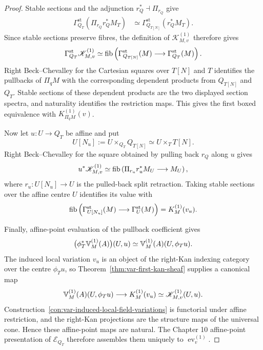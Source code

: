\begin{proof}
Stable sections and the adjunction \(r_Q^*\dashv\Pi_{r_Q}\) give
\[
\begin{aligned}
    \Gamma_{Q_T}^{\mathrm{st}}
    \left(
      \Pi_{r_Q}r_Q^*M_T
    \right)
    &\simeq
    \Gamma_{Q_{T[N]}}^{\mathrm{st}}
    (r_Q^*M_T).
\end{aligned}
\]
Since stable sections preserve fibres, the definition of \(\mathscr K^{(1)}_{M,v}\) therefore gives
\[
    \Gamma_{Q_T}^{\mathrm{st}}
    \mathscr K^{(1)}_{M,v}
    \simeq
    \operatorname{fib}\left(
      \Gamma_{Q_{T[N]}}^{\mathrm{st}}(M)
      \longrightarrow
      \Gamma_{Q_T}^{\mathrm{st}}(M)
    \right).
\]
Right Beck--Chevalley for the Cartesian squares over \(T[N]\) and \(T\) identifies the pullbacks of \(\Pi_qM\) with the corresponding dependent products from \(Q_{T[N]}\) and \(Q_T\). Stable sections of these dependent products are the two displayed section spectra, and naturality identifies the restriction maps. This gives the first boxed equivalence with \(K_{\Pi_qM}^{(1)}(v)\).

Now let \(u:U\to Q_T\) be affine and put
\[
    U[N_u]:=U\times_{Q_T}Q_{T[N]}
    \simeq
    U\times_TT[N].
\]
Right Beck--Chevalley for the square obtained by pulling back \(r_Q\) along \(u\) gives
\[
    u^*\mathscr K^{(1)}_{M,v}
    \simeq
    \operatorname{fib}\left(
      \Pi_{r_u}r_u^*M_U
      \longrightarrow
      M_U
    \right),
\]
where \(r_u:U[N_u]\to U\) is the pulled-back split retraction. Taking stable sections over the affine centre \(U\) identifies its value with
\[
    \operatorname{fib}\left(
      \Gamma_{U[N_u]}^{\mathrm{st}}(M)
      \longrightarrow
      \Gamma_U^{\mathrm{st}}(M)
    \right)
    =
    K_M^{(1)}(v_u).
\]

Finally, affine-point evaluation of the pullback coefficient gives
\[
    \bigl(\phi_T^*\mathbb V^{(1)}_M(A)\bigr)(U,u)
    \simeq
    \mathbb V^{(1)}_M(A)(U,\phi_Tu).
\]
The induced local variation \(v_u\) is an object of the right-Kan indexing category over the centre \(\phi_Tu\), so Theorem~\ref{thm:var-first-kan-sheaf} supplies a canonical map
\[
    \mathbb V^{(1)}_M(A)(U,\phi_Tu)
    \longrightarrow
    K_M^{(1)}(v_u)
    \simeq
    \mathscr K^{(1)}_{M,v}(U,u).
\]
Construction~\ref{con:var-induced-local-field-variations} is functorial under affine restriction, and the right-Kan projections are the structure maps of the universal cone. Hence these affine-point maps are natural. The Chapter 10 affine-point presentation of \(\mathcal E_{Q_T}\) therefore assembles them uniquely to \(\operatorname{ev}^{(1)}_v\).
\end{proof}

